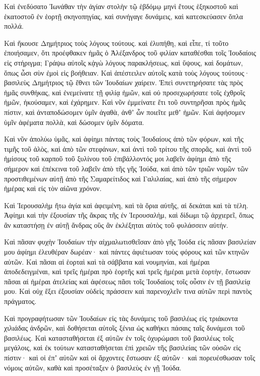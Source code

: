 {Καὶ ἐνεδύσατο Ἰωνάθαν τὴν ἁγίαν στολὴν τῷ ἑβδόμῳ μηνὶ ἔτους ἑξηκοστοῦ καὶ ἑκατοστοῦ ἐν ἑορτῇ σκηνοπηγίας, καὶ συνήγαγε δυνάμεις, καὶ κατεσκεύασεν ὅπλα πολλά.
\par }{\PP {}Καὶ ἤκουσε Δημήτριος τοὺς λόγους τούτους. καὶ ἐλυπήθη, καὶ εἶπε,
τί τοῦτο ἐποιήσαμεν, ὅτι προέφθακεν ἡμᾶς ὁ Ἀλέξανδρος τοῦ φιλίαν καταθέσθαι τοῖς Ἰουδαίοις εἰς στήριγμα;
Γράψω αὐτοῖς κᾀγὼ λόγους παρακλήσεως, καὶ ὕψους, καὶ δομάτων, ὅπως ὦσι σὺν ἐμοὶ εἰς βοήθειαν.
Καὶ ἀπέστειλεν αὐτοῖς κατὰ τοὺς λόγους τούτους· βασιλεὺς Δημήτριος τῷ ἔθνει τῶν Ἰουδαίων χαίρειν.
Ἐπεὶ συνετηρήσατε τὰς πρὸς ἡμᾶς συνθήκας, καὶ ἐνεμείνατε τῇ φιλίᾳ ἡμῶν, καὶ οὐ προσεχωρήσατε τοῖς ἐχθροῖς ἡμῶν, ἠκούσαμεν, καὶ ἐχάρημεν.
Καὶ νῦν ἐμμείνατε ἔτι τοῦ συντηρῆσαι πρὸς ἡμᾶς πίστιν, καὶ ἀνταποδώσομεν ὑμῖν ἀγαθὰ, ἀνθʼ ὧν ποιεῖτε μεθʼ ἡμῶν.
Καὶ ἀφήσομεν ὑμῖν ἀφέματα πολλὰ, καὶ δώσομεν ὑμῖν δόματα.
\par }{\PP {}Καὶ νῦν ἀπολύω ὑμᾶς, καὶ ἀφίημι πάντας τοὺς Ἰουδαίους ἀπὸ τῶν φόρων, καὶ τῆς τιμῆς τοῦ ἁλὸς, καὶ ἀπὸ τῶν στεφάνων,
καὶ ἀντὶ τοῦ τρίτου τῆς σπορᾶς, καὶ ἀντὶ τοῦ ἡμίσους τοῦ καρποῦ τοῦ ξυλίνου τοῦ ἐπιβάλλοντός μοι λαβεῖν ἀφίημι ἀπὸ τῆς σήμερον καὶ ἐπέκεινα τοῦ λαβεῖν ἀπὸ τῆς γῆς Ἰούδα, καὶ ἀπὸ τῶν τριῶν νομῶν τῶν προστιθεμένων αὐτῇ ἀπὸ τῆς Σαμαρείτιδος καὶ Γαλιλαίας, καὶ ἀπὸ τῆς σήμερον ἡμέρας καὶ εἰς τὸν αἰῶνα χρόνον.
\par }{\PP {}Καὶ Ἱερουσαλὴμ ἤτω ἁγία καὶ ἀφειμένη, καὶ τὰ ὅρια αὐτῆς, αἱ δεκάται καὶ τὰ τέλη.
Ἀφίημι καὶ τὴν ἐξουσίαν τῆς ἄκρας τῆς ἐν Ἱερουσαλὴμ, καὶ δίδωμι τῷ ἀρχιερεῖ, ὅπως ἂν καταστήσῃ ἐν αὐτῇ ἄνδρας οὓς ἂν ἐκλέξηται αὐτὸς τοῦ φυλάσσειν αὐτήν.
\par }{\PP {}Καὶ πᾶσαν φυχὴν Ἰουδαίων τὴν αἰχμαλωτισθεῖσαν ἀπὸ γῆς Ἰούδα εἰς πᾶσαν βασιλείαν μου ἀφίημι ἐλευθέραν δωρέαν· καὶ πάντες ἀφιέτωσαν τοὺς φόρους καὶ τῶν κτηνῶν αὐτῶν.
Καὶ πᾶσαι αἱ ἑορταὶ καὶ τὰ σάββατα καὶ νουμηνίαι, καὶ ἡμέραι ἀποδεδειγμέναι, καὶ τρεῖς ἡμέραι πρὸ ἑορτῆς καὶ τρεῖς ἡμέραι μετὰ ἑορτὴν, ἔστωσαν πᾶσαι αἱ ἡμέραι ἀτελείας καὶ ἀφέσεως πᾶσι τοῖς Ἰουδαίοις τοῖς οὖσιν ἐν τῇ βασιλείᾳ μου.
Καὶ οὐχ ἕξει ἐξουσίαν οὐδεὶς πράσσειν καὶ παρενοχλεῖν τινα αὐτῶν περὶ παντὸς πράγματος.
\par }{\PP {}Καὶ προγραφήτωσαν τῶν Ἰουδαίων εἰς τὰς δυνάμεις τοῦ βασιλέως εἰς τριάκοντα χιλιάδας ἀνδρῶν, καὶ δοθήσεται αὐτοῖς ξένια ὡς καθήκει πάσαις ταῖς δυνάμεσι τοῦ βασιλέως.
Καὶ κατασταθήσεται ἐξ αὐτῶν ἐν τοῖς ὀχυρώμασι τοῦ βασιλέως τοῖς μεγάλοις, καὶ ἐκ τούτων κατασταθήσεται ἐπὶ χρειῶν τῆς βασιλείας τῶν οὐσῶν εἰς πίστιν· καὶ οἱ ἐπʼ αὐτῶν καὶ οἱ ἄρχοντες ἔστωσαν ἐξ αὐτῶν· καὶ πορευέσθωσαν τοῖς νόμοις αὐτῶν, καθὰ καὶ προσέταξεν ὁ βασιλεὺς ἐν γῇ Ἰούδα.
}
